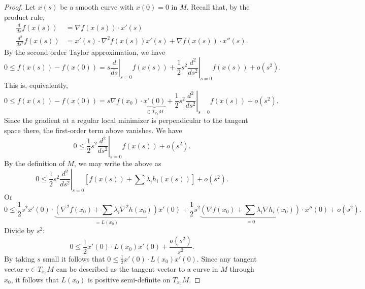 \documentclass[11pt]{book}
\begin{document}
\begin{proof}
Let $x(s)$ be a smooth curve with $x(0) = 0$ in $M$. Recall that, by the product rule,
\begin{align*}
\frac{d}{ds} f(x(s)) &= \nabla f(x(s)) \cdot x'(s) \\
\frac{d^2}{ds^2} f(x(s)) &= x'(s) \cdot \nabla^2 f(x(s)) x'(s) + \nabla f(x(s)) \cdot x''(s).
\end{align*}
By the second order Taylor approximation, we have
\[
0 \leq f(x(s)) - f(x(0)) = s \left. \frac{d}{ds} \right|_{s=0} f(x(s)) + \frac{1}{2}s^2 \left. \frac{d^2}{ds^2} \right|_{s=0} f(x(s)) + o(s^2).
\]
This is, equivalently, 
\[
0 \leq f(x(s)) - f(x(0)) = s \nabla f(x_0) \cdot \underbrace{x'(0)}_{\in T_{x_0}M} + \frac{1}{2}s^2 \left. \frac{d^2}{ds^2} \right|_{s=0} f(x(s)) + o(s^2).
\]
Since the gradient at a regular local minimizer is perpendicular to the tangent space there, the first-order term above vanishes. We have
\[
0 \leq \frac{1}{2}s^2 \left. \frac{d^2}{ds^2} \right|_{s=0} f(x(s)) + o(s^2).
\]
By the definition of $M$, we may write the above as
\[
0 \leq \frac{1}{2}s^2 \left. \frac{d^2}{ds^2} \right|_{s=0} \left[ f(x(s)) + \sum \lambda_i h_i(x(s)) \right] + o(s^2).
\]
Or
\[
0 \leq \frac{1}{2} s^2 x'(0) \cdot \underbrace{\left(\nabla^2 f(x_0) + \sum \lambda_i \nabla^2 h(x_0)\right)}_{=L(x_0)}x'(0) + \frac{1}{2} s^2 \underbrace{\left(\nabla f(x_0) + \sum \lambda_i \nabla h_i(x_0)\right)}_{=0} \cdot x''(0) + o(s^2).
\]
Divide by $s^2$:
\[
0 \leq \frac{1}{2} x'(0) \cdot L(x_0) x'(0) + \frac{o(s^2)}{s^2}.
\]
By taking $s$ small it follows that $0 \leq \frac{1}{2} x'(0) \cdot L(x_0) x'(0)$. Since any tangent vector $v \in T_{x_0}M$ can be described as the tangent vector to a curve in $M$ through $x_0$, it follows that $L(x_0)$ is positive semi-definite on $T_{x_0}M$.
\end{proof}
\end{document}
